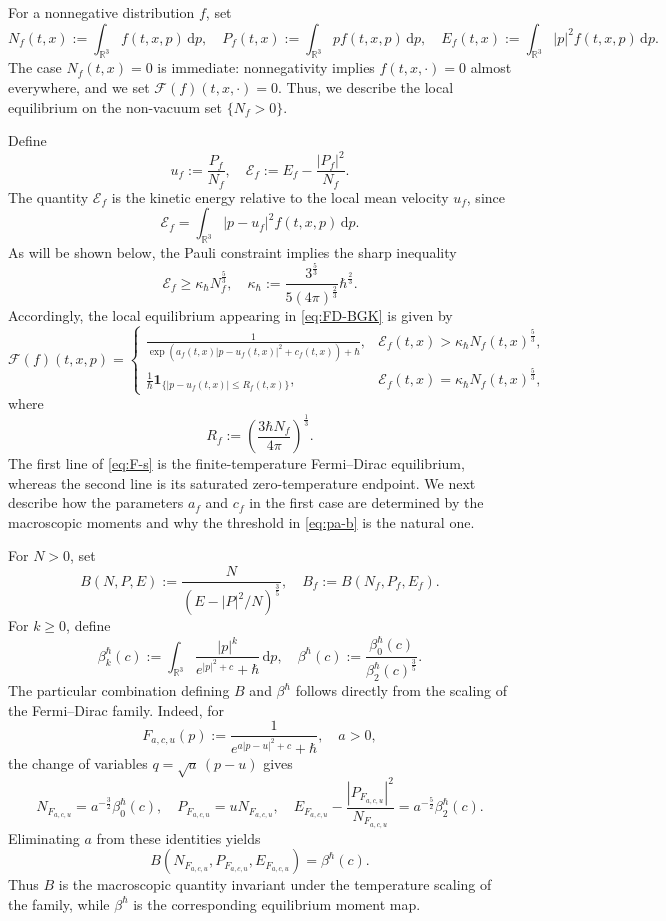 \documentclass[10pt,reqno]{amsart}
\numberwithin{equation}{section}
\theoremstyle{definition}
\newcommand{\R}{\mathbb R}
\newcommand{\dpp}{\mathrm{d}p}
\newcommand{\kappah}{\kappa_{\hbar}}
\newcommand{\one}{\mathbf 1}
\newcommand{\calE}{\mathcal E}
\newcommand{\calF}{\mathcal F}
\newcommand{\bq}{\begin{equation}}
\newcommand{\eq}{\end{equation}}
\newcommand{\lt}{\left}
\newcommand{\rt}{\right}
\begin{document}
For a nonnegative distribution $f$, set
\[
 N_f(t,x):=\int_{\R^3}f(t,x,p)\,\dpp,  \quad  P_f(t,x):=\int_{\R^3}pf(t,x,p)\,\dpp,  \quad  E_f(t,x):=\int_{\R^3}|p|^2f(t,x,p)\,\dpp.
\]
The case $N_f(t,x)=0$ is immediate: nonnegativity implies $f(t,x,\cdot)=0$ almost everywhere, and we set $\calF(f)(t,x,\cdot)=0$.  Thus, we describe the local equilibrium on the non-vacuum set $\{N_f>0\}$.

Define
\[
 u_f:=\frac{P_f}{N_f},  \quad  \calE_f:=E_f-\frac{|P_f|^2}{N_f}.
\]
The quantity $\calE_f$ is the kinetic energy relative to the local mean velocity $u_f$, since
\[
 \calE_f  =  \int_{\R^3}|p-u_f|^2f(t,x,p)\,\dpp. 
 \]  
As will be shown below, the Pauli constraint implies the sharp inequality
\bq \label{eq:pa-b}
 \calE_f\geq \kappah N_f^{\frac53},  \quad  \kappah:=  \frac{3^{\frac53}}{5(4\pi)^{\frac23}}\hbar^{\frac23}.
\eq
Accordingly, the local equilibrium appearing in \eqref{eq:FD-BGK} is given by
\bq \label{eq:F-s}
 \calF(f)(t,x,p)
 =
 \begin{cases}
 \displaystyle  \frac{1}{  \exp \lt(  a_f(t,x)|p-u_f(t,x)|^2+c_f(t,x)  \rt)+\hbar},  &  \calE_f(t,x) >\kappah N_f(t,x)^{\frac53},  \\[3mm]
 \displaystyle  \frac1\hbar  \one_{\{|p-u_f(t,x)|\leq R_f(t,x)\}},  &  \calE_f(t,x) = \kappah N_f(t,x)^{\frac53},
 \end{cases}
\eq
where
\[
 R_f:=\lt(\frac{3\hbar N_f}{4\pi}\rt)^{\frac13}.
\]
The first line of \eqref{eq:F-s} is the finite-temperature Fermi--Dirac equilibrium, whereas the second line is its saturated zero-temperature endpoint.  We next describe how the parameters $a_f$ and $c_f$ in the first case are determined by the macroscopic moments and why the threshold in \eqref{eq:pa-b} is the natural one.

For $N>0$, set
\[
 B(N,P,E):=  \frac{N}{(E-|P|^2/N)^{\frac35}},  \quad  B_f:=B(N_f,P_f,E_f).
\]
For $k\geq0$, define
\[
 \beta_k^{\hbar}(c):=  \int_{\R^3}  \frac{|p|^k}{e^{|p|^2+c}+\hbar}\,\dpp,  \quad  \beta^{\hbar}(c):=  \frac{\beta_0^{\hbar}(c)}{\beta_2^{\hbar}(c)^{\frac35}}.
\]
The particular combination defining $B$ and $\beta^{\hbar}$ follows directly from the scaling of the Fermi--Dirac family.  Indeed, for
\[
 F_{a,c,u}(p):=  \frac1{e^{a|p-u|^2+c}+\hbar},  \quad a>0,
\]
the change of variables $q=\sqrt a\,(p-u)$ gives
\[
 N_{F_{a,c,u}} =a^{-\frac32}\beta_0^{\hbar}(c), \quad P_{F_{a,c,u}} =uN_{F_{a,c,u}},\quad  E_{F_{a,c,u}}  -\frac{|P_{F_{a,c,u}}|^2}{N_{F_{a,c,u}}} =a^{-\frac52}\beta_2^{\hbar}(c).
\]
Eliminating $a$ from these identities yields
\[
 B(  N_{F_{a,c,u}},  P_{F_{a,c,u}},  E_{F_{a,c,u}})  =  \beta^{\hbar}(c).
\]
Thus $B$ is the macroscopic quantity invariant under the temperature scaling of the family, while $\beta^{\hbar}$ is the corresponding equilibrium moment map.
\end{document}
